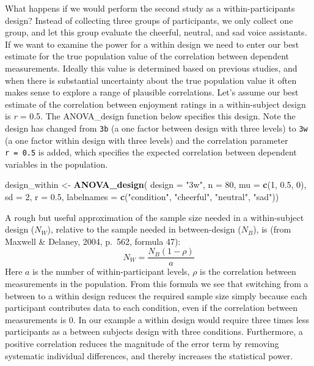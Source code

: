 \documentclass[
  ,jou,floatsintext]{apa6}
\newenvironment{Shaded}{\begin{snugshade}}{\end{snugshade}}
\newcommand{\DataTypeTok}[1]{\textcolor[rgb]{0.13,0.29,0.53}{#1}}
\newcommand{\DecValTok}[1]{\textcolor[rgb]{0.00,0.00,0.81}{#1}}
\newcommand{\FloatTok}[1]{\textcolor[rgb]{0.00,0.00,0.81}{#1}}
\newcommand{\KeywordTok}[1]{\textcolor[rgb]{0.13,0.29,0.53}{\textbf{#1}}}
\newcommand{\NormalTok}[1]{#1}
\newcommand{\StringTok}[1]{\textcolor[rgb]{0.31,0.60,0.02}{#1}}
\begin{document}
What happens if we would perform the second study as a within-participants design?
Instead of collecting three groups of participants, we only collect one group, and let this group evaluate the cheerful, neutral, and sad voice assistants.
If we want to examine the power for a within design we need to enter our best estimate for the true population value of the correlation between dependent measurements.
Ideally this value is determined based on previous studies, and when there is substantial uncertainty about the true population value it often makes sense to explore a range of plausible correlations.
Let's assume our best estimate of the correlation between enjoyment ratings in a within-subject design is \emph{r} = 0.5.
The ANOVA\_design function below specifies this design.
Note the design has changed from \texttt{3b} (a one factor between design with three levels) to \texttt{3w} (a one factor within design with three levels) and the correlation parameter \texttt{r\ =\ 0.5} is added, which specifies the expected correlation between dependent variables in the population.

\begin{Shaded}
\begin{Highlighting}[]
\NormalTok{design_within <-}\StringTok{ }\KeywordTok{ANOVA_design}\NormalTok{(}
  \DataTypeTok{design =} \StringTok{"3w"}\NormalTok{, }\DataTypeTok{n =} \DecValTok{80}\NormalTok{, }\DataTypeTok{mu =} \KeywordTok{c}\NormalTok{(}\DecValTok{1}\NormalTok{, }\FloatTok{0.5}\NormalTok{, }\DecValTok{0}\NormalTok{), }
  \DataTypeTok{sd =} \DecValTok{2}\NormalTok{, }\DataTypeTok{r =} \FloatTok{0.5}\NormalTok{,}
  \DataTypeTok{labelnames =} \KeywordTok{c}\NormalTok{(}\StringTok{"condition"}\NormalTok{, }
                 \StringTok{"cheerful"}\NormalTok{, }
                 \StringTok{"neutral"}\NormalTok{, }\StringTok{"sad"}\NormalTok{))}
\end{Highlighting}
\end{Shaded}

A rough but useful approximation of the sample size needed in a within-subject design (\(N_W\)), relative to the sample needed in between-design (\(N_B\)), is (from Maxwell \& Delaney, 2004, p.~562, formula 47):
\begin{equation}
N_{W}=\frac{N_{B}(1-\rho)}{a} \label{eq:within-n}
\end{equation}
Here \(a\) is the number of within-participant levels, \(\rho\) is the correlation between measurements in the population.
From this formula we see that switching from a between to a within design reduces the required sample size simply because each participant contributes data to each condition, even if the correlation between measurements is 0.
In our example a within design would require three times less participants as a between subjects design with three conditions.
Furthermore, a positive correlation reduces the magnitude of the error term by removing systematic individual differences, and thereby increases the statistical power.
\end{document}
